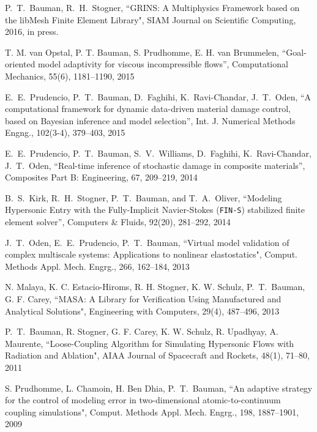 P.~T.~Bauman, R.~H.~Stogner, ``GRINS: A Multiphysics Framework based on
the libMesh Finite Element Library", SIAM Journal on Scientific
Computing, 2016, in press.

\blankline

T. M. van Opstal, P. T. Bauman, S. Prudhomme, E. H. van Brummelen,
``Goal-oriented model adaptivity for viscous incompressible flows'',
Computational Mechanics, 55(6), 1181--1190, 2015

\blankline

E.~E.~Prudencio, P.~T.~Bauman, D.~Faghihi,
K.~Ravi-Chandar, J.~T.~Oden,
``A computational framework for dynamic data-driven material damage
control, based on Bayesian inference and model selection'',
Int. J. Numerical Methods Engng., 102(3-4), 379--403, 2015

\blankline

E.~E.~Prudencio, P.~T.~Bauman, S.~V.~Williams, D.~Faghihi,
K.~Ravi-Chandar, J.~T.~Oden,
``Real-time inference of stochastic damage in composite materials'',
Composites Part B: Engineering, 67, 209--219, 2014

\blankline

%
B.~S.~Kirk, R.~H.~Stogner, P.~T.~Bauman, and T.~A.~Oliver,
``Modeling Hypersonic Entry with the Fully-Implicit Navier-Stokes (\texttt{FIN-S})
stabilized finite element solver'', Computers \& Fluids, 92(20),
281--292, 2014

\blankline

J.~T.~Oden, E.~E.~Prudencio, P.~T.~Bauman,
``Virtual model validation of complex multiscale systems:
Applications to nonlinear elastostatics",
Comput. Methods Appl. Mech. Engrg., 266, 162--184, 2013

\blankline

N. Malaya, K. C. Estacio-Hiroms, R. H. Stogner, K. W. Schulz, P.~T.~Bauman,
G. F. Carey,
``MASA: A Library for Verification Using Manufactured and Analytical Solutions",
Engineering with Computers, 29(4), 487--496, 2013

\blankline

P.~T.~Bauman, R. Stogner, G. F. Carey, K. W. Schulz, R. Upadhyay, A. Maurente, ``Loose-Coupling Algorithm for Simulating
Hypersonic Flows with Radiation and Ablation", AIAA Journal of
Spacecraft and Rockets, 48(1), 71--80, 2011

\blankline

S. Prudhomme, L. Chamoin, H. Ben Dhia, P.~T.~Bauman, ``An adaptive
strategy for the control of modeling error in two-dimensional
atomic-to-continuum coupling simulations", Comput. Methods
Appl. Mech. Engrg., 198, 1887--1901, 2009

